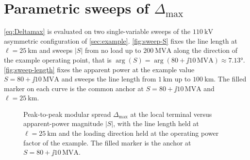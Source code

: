 
\section{Parametric sweeps of $\Delta_{\max}$}
\label{sec:sweeps}

\autoref{eq:Deltamax} is evaluated on two single-variable sweeps of the
$\SI{110}{\kilo\volt}$ asymmetric configuration of
\autoref{sec:example}. \autoref{fig:sweep-S} fixes the line length at
$\ell=\SI{25}{\kilo\metre}$ and sweeps $|S|$ from no load up to
$\SI{200}{\mega\volt\ampere}$ along the direction of the example
operating point, that is $\arg(S)=\arg(80+\jj 10\,\si{\mega\volt\ampere})
\approx 7.13\si{\degree}$. \autoref{fig:sweep-length} fixes the apparent
power at the example value $S=80+\jj 10\,\si{\mega\volt\ampere}$ and
sweeps the line length from $\SI{1}{\kilo\metre}$ up to
$\SI{100}{\kilo\metre}$. The filled marker on each curve is the common
anchor at $S=80+\jj 10\,\si{\mega\volt\ampere}$ and
$\ell=\SI{25}{\kilo\metre}$.

\begin{figure}[ht]
\centering
{}
\caption{Peak-to-peak modular spread $\Delta_{\max}$ at the local
terminal versus apparent-power magnitude $|S|$, with the line length
held at $\ell=\SI{25}{\kilo\metre}$ and the loading direction held at
the operating power factor of the example. The filled marker is the
anchor at $S=80+\jj 10\,\si{\mega\volt\ampere}$.}
\label{fig:sweep-S}
\end{figure}

